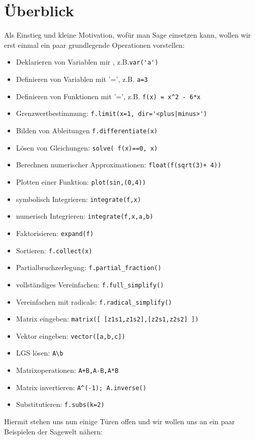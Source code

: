 \documentclass[fontsize=12pt,paper=a4,twoside,bibtotoc,idxtotoc,
liststotoc,pagesize,BCOR1.2cm,DIV15,chapterprefix,pagesize=pdftex]{scrbook}
\begin{document}
\section{Überblick}

Als Einstieg und kleine Motivation, wofür man Sage einsetzen kann, wollen wir erst einmal ein paar grundlegende Operationen 
vorstellen:
\begin{itemize}
 \item Deklarieren von Variablen mir , z.B.{\verb~var('a')~} 
 \item Definieren von Variablen mit {\color{blue}'='}, z.B. {\verb~a=3~} 
 \item Definieren von Funktionen mit{\color{blue} '='}, z.B. {\verb~f(x) = x^2 - 6*x~}
 \item Grenzwertbestimmung: {\color{blue}   \verb~f.limit(x=1, dir='<plus|minus>')~}
 \item Bilden von Ableitungen {\color{blue} \verb~f.differentiate(x)~}
 \item Lösen von Gleichungen: {\color{blue} \verb~solve( f(x)==0, x)~}
 \item Berechnen numerischer Approximationen: {\color{blue} \verb~float(f(sqrt(3)+ 4))~}
 \item Plotten einer Funktion: {\color{blue} \verb~plot(sin,(0,4))~}
 \item symbolisch Integrieren: {\color{blue} \verb~integrate(f,x)~}
 \item numerisch Integrieren: {\color{blue} \verb~integrate(f,x,a,b)~}
 \item Faktorisieren: {\color{blue} \verb~expand(f)~}
 \item Sortieren: {\color{blue} \verb~f.collect(x)~}
 \item Partialbruchzerlegung: {\color{blue} \verb~f.partial_fraction()~}
 \item vollständiges Vereinfachen: {\color{blue} \verb~f.full_simplify()~}
 \item Vereinfachen mit radicals: {\color{blue} \verb~f.radical_simplify()~}
 \item Matrix eingeben: {\color{blue} \verb~matrix([ [z1s1,z1s2],[z2s1,z2s2] ])~}
 \item Vektor eingeben: {\color{blue} \verb~vector([a,b,c])~}
 \item LGS lösen: {\color{blue} \verb~A\b~}
 \item Matrixoperationen: {\color{blue} \verb~A+B,A-B,A*B~}
 \item Matrix invertieren: {\color{blue} \verb~A^(-1); A.inverse()~}
 \item Substitutieren: {\color{blue} \verb~f.subs(k=2)~}
\end{itemize}
Hiermit stehen uns nun einige Türen offen und wir wollen uns an ein paar Beispielen der Sagewelt nähern:\newpage
\end{document}

